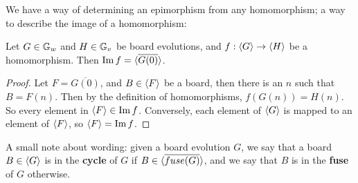\documentclass[12pt,letterpaper]{article}
\begin{document}


We have a way of determining an epimorphism from any homomorphism; a way to describe the image of a homomorphism:
\begin{prop}\label{imageOfhomo}
  Let $G\in \mathbb{G}_w$ and $H\in \mathbb{G}_v$ be board evolutions, and $f:\langle G\rangle\rightarrow \langle H\rangle$ be a homomorphism. Then $\operatorname{Im } f = \langle\overline{G(0)}\rangle$.
\end{prop}
\begin{proof} 
  Let $F=\overline{G(0)}$, and $B\in\langle F\rangle$ be a board, then there is an $n$ such that $B=F(n)$. Then by the definition of homomorphisms, $f(G(n))=H(n)$. So every element in $\langle F\rangle\in\operatorname{Im } f$. Conversely, each element of $\langle G\rangle$ is mapped to an element of $\langle F\rangle$, so $\langle F\rangle=\operatorname{Im } f$. 
\end{proof}

\begin{remark}
  A small note about wording: given a board evolution $G$, we say that a board $B\in\langle G\rangle$ is in the {\bf cycle} of $G$ if $B\in\langle\overline{fuse(G)}\rangle$, and we say that $B$ is in the {\bf fuse} of $G$ otherwise.
\end{remark}
\end{document}
